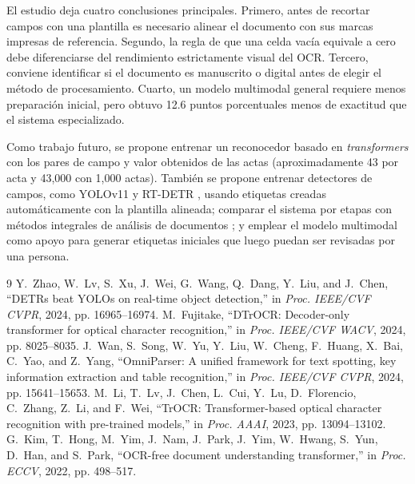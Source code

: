 \documentclass[conference]{IEEEtran}
\begin{document}
El estudio deja cuatro conclusiones principales. Primero, antes de recortar
campos con una plantilla es necesario alinear el documento con sus marcas
impresas de referencia. Segundo, la regla de que una celda vac\'ia equivale a
cero debe diferenciarse del rendimiento estrictamente visual del OCR. Tercero,
conviene identificar si el documento es manuscrito o digital antes de elegir
el m\'etodo de procesamiento. Cuarto, un modelo multimodal general requiere
menos preparaci\'on inicial, pero obtuvo 12.6 puntos porcentuales menos de
exactitud que el sistema especializado.

Como trabajo futuro, se propone entrenar un reconocedor basado en
\emph{transformers} con los pares de campo y valor obtenidos de las actas
(aproximadamente 43 por acta y 43,000 con 1,000 actas). Tambi\'en se propone
entrenar detectores de campos, como YOLOv11 y RT-DETR \cite{rtdetr}, usando
etiquetas creadas autom\'aticamente con la plantilla alineada; comparar el
sistema por etapas con m\'etodos integrales de an\'alisis de documentos
\cite{omniparser,donut}; y emplear el modelo multimodal como apoyo para generar
etiquetas iniciales que luego puedan ser revisadas por una persona.

\begin{thebibliography}{9}
 Y.~Zhao, W.~Lv, S.~Xu, J.~Wei, G.~Wang, Q.~Dang, Y.~Liu,
and J.~Chen, ``DETRs beat YOLOs on real-time object detection,'' in
\emph{Proc. IEEE/CVF CVPR}, 2024, pp. 16965--16974.
 M.~Fujitake, ``DTrOCR: Decoder-only transformer for optical
character recognition,'' in \emph{Proc. IEEE/CVF WACV}, 2024, pp. 8025--8035.
 J.~Wan, S.~Song, W.~Yu, Y.~Liu, W.~Cheng, F.~Huang,
X.~Bai, C.~Yao, and Z.~Yang, ``OmniParser: A unified framework for text
spotting, key information extraction and table recognition,'' in \emph{Proc.
IEEE/CVF CVPR}, 2024, pp. 15641--15653.
 M.~Li, T.~Lv, J.~Chen, L.~Cui, Y.~Lu, D.~Florencio, C.~Zhang,
Z.~Li, and F.~Wei, ``TrOCR: Transformer-based optical character recognition
with pre-trained models,'' in \emph{Proc. AAAI}, 2023, pp. 13094--13102.
 G.~Kim, T.~Hong, M.~Yim, J.~Nam, J.~Park, J.~Yim, W.~Hwang,
S.~Yun, D.~Han, and S.~Park, ``OCR-free document understanding transformer,''
in \emph{Proc. ECCV}, 2022, pp. 498--517.
\end{thebibliography}
\end{document}
